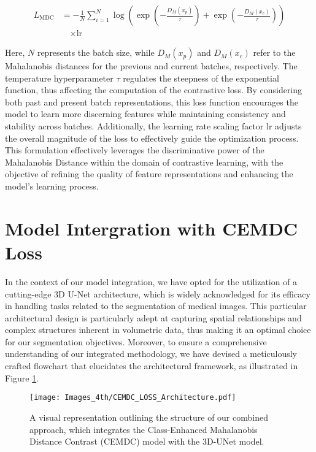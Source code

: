 \begin{equation} \label{EQ:MDC}
\begin{aligned}
L_{\text{MDC}} &= -\frac{1}{N} \sum_{i=1}^{N} \log\left(\exp\left(-\frac{D_M(x_p)}{\tau}\right) + \exp\left(-\frac{D_M(x_c)}{\tau}\right)\right) \\
&\quad \times \text{lr}
\end{aligned}
\end{equation}

\noindent Here, \(N\) represents the batch size, while \(D_M(x_p)\) and \(D_M(x_c)\) refer to the Mahalanobis distances for the previous and current batches, respectively. The temperature hyperparameter \(\tau\) regulates the steepness of the exponential function, thus affecting the computation of the contrastive loss. By considering both past and present batch representations, this loss function encourages the model to learn more discerning features while maintaining consistency and stability across batches. Additionally, the learning rate scaling factor \(\text{lr}\) adjusts the overall magnitude of the loss to effectively guide the optimization process. This formulation effectively leverages the discriminative power of the Mahalanobis Distance within the domain of contrastive learning, with the objective of refining the quality of feature representations and enhancing the model's learning process.

\section{Model Intergration with CEMDC Loss}
In the context of our model integration, we have opted for the utilization of a cutting-edge 3D U-Net architecture, which is widely acknowledged for its efficacy in handling tasks related to the segmentation of medical images. This particular architectural design is particularly adept at capturing spatial relationships and complex structures inherent in volumetric data, thus making it an optimal choice for our segmentation objectives. Moreover, to ensure a comprehensive understanding of our integrated methodology, we have devised a meticulously crafted flowchart that elucidates the architectural framework, as illustrated in Figure \ref{Image: CEMDC Architecture}. 

\begin{figure}[!h]
  \centering
   \texttt{[image: Images\_4th/CEMDC\_LOSS\_Architecture.pdf]}
    \caption{A visual representation outlining the structure of our combined approach, which integrates the Class-Enhanced Mahalanobis Distance Contrast (CEMDC) model with the 3D-UNet model.}
  \label{Image: CEMDC Architecture}
\end{figure}


